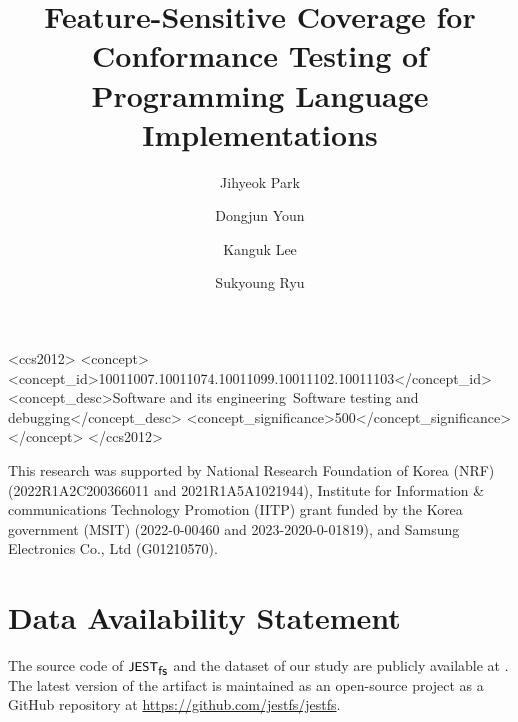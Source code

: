 \documentclass[acmsmall,screen]{acmart}
\begin{document}
\title[Feature-Sensitive Coverage for Conformance Testing]
{Feature-Sensitive Coverage for Conformance Testing of Programming Language
Implementations}

\author{Jihyeok Park}

\author{Dongjun Youn}

\author{Kanguk Lee}

\author{Sukyoung Ryu}



\begin{CCSXML}
  <ccs2012>
  <concept>
  <concept_id>10011007.10011074.10011099.10011102.10011103</concept_id>
  <concept_desc>Software and its engineering~Software testing and debugging</concept_desc>
  <concept_significance>500</concept_significance>
  </concept>
  </ccs2012>
\end{CCSXML}



\maketitle









\begin{acks}
This research was supported by National Research Foundation of Korea (NRF)
(2022R1A2C200366011 and 2021R1A5A1021944), Institute for Information \&
communications Technology Promotion (IITP) grant funded by the Korea government
(MSIT) (2022-0-00460 and 2023-2020-0-01819), and Samsung Electronics Co., Ltd
(G01210570).
\end{acks}

\section*{Data Availability Statement}\label{sec:data}

The source code of $\textsf{\small JEST}_{\textsf{\small fs}}$ and the dataset of our study are publicly available
at \cite{artifact}. The latest version of the artifact is maintained as an
open-source project as a GitHub repository at
\url{https://github.com/jestfs/jestfs}.

\balance

\end{document}
